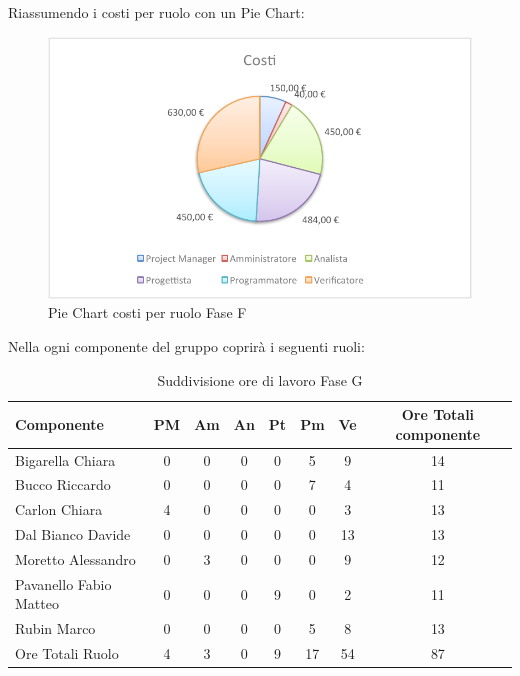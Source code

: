 				Riassumendo i costi per ruolo con un Pie Chart:
				\begin{figure}[H]\centering
					\includegraphics[width=\textwidth]{PianoDiProgetto/Pics/ChartTotCostiFaseF.pdf}
					\caption{Pie Chart costi per ruolo Fase F}
				\end{figure}
				Nella  ogni componente del gruppo \groupname{} coprirà i seguenti ruoli:
				\begin{table}[H]
					\begin{center}
						\begin{tabular}{| l | c | c | c | c | c | c | c |}
							\hline
							Componente 					& PM	& Am 	& An 	& Pt 		& Pm 	& Ve 		& Ore Totali componente \\ \hline
							
							Bigarella Chiara 			& 0		& 0		& 0		& 0		& 5 		& 9 		& 14 \\
							Bucco Riccardo 				& 0		& 0		& 0		& 0		& 7			& 4 		& 11 \\
							Carlon Chiara	 			& 4 	& 0		& 0		& 0		& 0			& 3 		& 13 \\
							Dal Bianco Davide 			& 0		& 0		& 0		& 0		& 0			& 13 		& 13 \\
							Moretto Alessandro 			& 0		& 3 	& 0		& 0		& 0			& 9 		& 12 \\
							Pavanello Fabio Matteo	 	& 0		& 0		& 0		& 9 	& 0			& 2 		& 11 \\
							Rubin Marco					& 0		& 0		& 0		& 0		& 5 		& 8 		& 13 \\ \hline \hline
							
							Ore Totali Ruolo 			& 4 	& 3 	& 0		& 9 	& 17 		& 54 		& 87\\ \hline
						\end{tabular}
					\end{center}
					\caption{Suddivisione ore di lavoro Fase G}
				\end{table}
